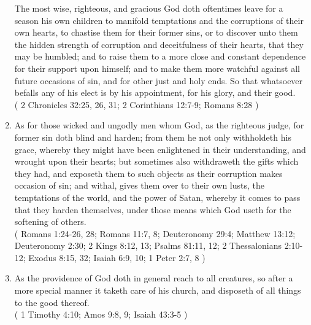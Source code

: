 \documentclass[12pt,a4paper]{book}
\begin{document}
\begin{enumerate}
\label{ch-div-pro-5}
The most wise, righteous, and gracious God doth oftentimes leave for a season his own children to manifold temptations and the corruptions of their own hearts, to chastise them for their former sins, or to discover unto them the hidden strength of corruption and deceitfulness of their hearts, that they may be humbled; and to raise them to a more close and constant dependence for their support upon himself; and to make them more watchful against all future occasions of sin, and for other just and holy ends. So that whatsoever befalls any of his elect is by his appointment, for his glory, and their good.\\
( 2 Chronicles 32:25, 26, 31; 2 Corinthians 12:7-9; Romans 8:28 )
\item
\label{ch-div-pro-6}
As for those wicked and ungodly men whom God, as the righteous judge, for former sin doth blind and harden; from them he not only withholdeth his grace, whereby they might have been enlightened in their understanding, and wrought upon their hearts; but sometimes also withdraweth the gifts which they had, and exposeth them to such objects as their corruption makes occasion of sin; and withal, gives them over to their own lusts, the temptations of the world, and the power of Satan, whereby it comes to pass that they harden themselves, under those means which God useth for the softening of others.\\
( Romans 1:24-26, 28; Romans 11:7, 8; Deuteronomy 29:4; Matthew 13:12; Deuteronomy 2:30; 2 Kings 8:12, 13; Psalms 81:11, 12; 2 Thessalonians 2:10-12; Exodus 8:15, 32; Isaiah 6:9, 10; 1 Peter 2:7, 8 )
\item
\label{ch-div-pro-7}
As the providence of God doth in general reach to all creatures, so after a more special manner it taketh care of his church, and disposeth of all things to the good thereof.\\
( 1 Timothy 4:10; Amos 9:8, 9; Isaiah 43:3-5 )
\end{enumerate}
\end{document}
